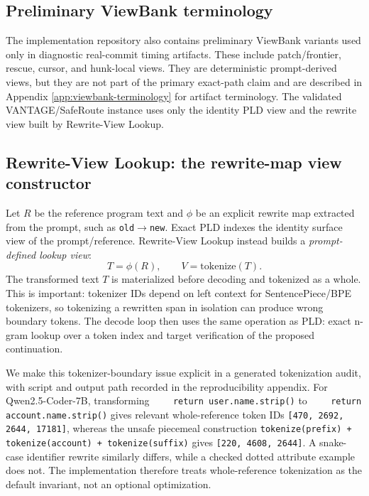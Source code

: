 \documentclass[11pt,a4paper]{article}
\begin{document}
\subsection{Preliminary ViewBank terminology}

The implementation repository also contains preliminary ViewBank variants used
only in diagnostic real-commit timing artifacts. These include patch/frontier,
rescue, cursor, and hunk-local views. They are deterministic prompt-derived
views, but they are not part of the primary exact-path claim and are described
in Appendix \ref{app:viewbank-terminology} for artifact terminology. The
validated VANTAGE/SafeRoute instance uses only the identity PLD view and the
rewrite view built by Rewrite-View Lookup.

\subsection{Rewrite-View Lookup: the rewrite-map view constructor}

Let $R$ be the reference program text and $\phi$ be an explicit rewrite
map extracted from the prompt, such as \texttt{old}$\rightarrow$\texttt{new}.
Exact PLD indexes the identity surface view of the prompt/reference.
Rewrite-View Lookup instead builds a \emph{prompt-defined lookup view}:
\[
  T = \phi(R), \qquad V = \mathrm{tokenize}(T).
\]
The transformed text $T$ is materialized before decoding and tokenized
as a whole. This is important: tokenizer IDs depend on left context for
SentencePiece/BPE tokenizers, so tokenizing a rewritten span in
isolation can produce wrong boundary tokens. The decode loop then uses
the same operation as PLD: exact n-gram lookup over a token index and
target verification of the proposed continuation.

We make this tokenizer-boundary issue explicit in a generated tokenization
audit, with script and output path recorded in the reproducibility appendix.
For Qwen2.5-Coder-7B, transforming
\texttt{~~~~return user.name.strip()} to
\texttt{~~~~return account.name.strip()} gives relevant whole-reference
token IDs \texttt{[470, 2692, 2644, 17181]}, whereas the unsafe
piecemeal construction \texttt{tokenize(prefix) + tokenize(account) +
tokenize(suffix)} gives \texttt{[220, 4608, 2644]}. A
snake-case identifier rewrite similarly differs, while a checked dotted
attribute example does not. The implementation therefore treats
whole-reference tokenization as the default invariant, not an optional
optimization.
\end{document}
